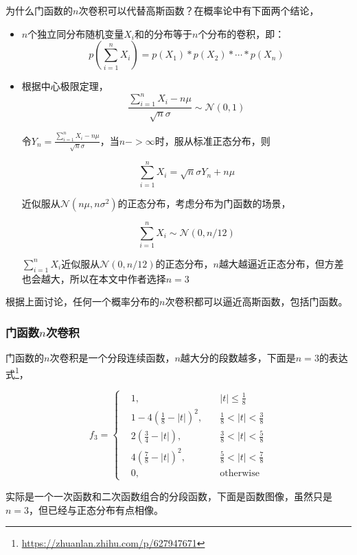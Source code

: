 			为什么门函数的$n$次卷积可以代替高斯函数？在概率论中有下面两个结论，
			\begin{itemize}
				\item $n$个独立同分布随机变量$X_i$和的分布等于$n$个分布的卷积，即：
				$$
					p\left(\sum_{i=1}^nX_i\right) = p(X_1) * p(X_2) * \cdots * p(X_n)
				$$
				\item 根据中心极限定理，
				$$
					\frac{\sum_{i=1}^nX_i - n\mu}{\sqrt{n}\sigma} \sim \mathcal{N}(0, 1)
				$$

				令$Y_n = \frac{\sum_{i=1}^nX_i - n\mu}{\sqrt{n}\sigma}$，当$n->\infty$时，服从标准正态分布，则

				$$
					\sum_{i=1}^nX_i  = \sqrt{n}\sigma Y_n + n\mu
				$$

				近似服从$\mathcal{N}(n\mu, n\sigma^2)$的正态分布，考虑分布为门函数的场景，

				$$
					\sum_{i=1}^nX_i \sim \mathcal{N}(0, n/12)
				$$

				$\sum_{i=1}^nX_i$近似服从$\mathcal{N}(0, n/12)$的正态分布，$n$越大越逼近正态分布，但方差也会越大，所以在本文中作者选择$n=3$
			\end{itemize}

			根据上面讨论，任何一个概率分布的$n$次卷积都可以逼近高斯函数，包括门函数。

		\subsubsection*{门函数$n$次卷积}
			门函数的$n$次卷积是一个分段连续函数，$n$越大分的段数越多，下面是$n=3$的表达式\footnote{\url{https://zhuanlan.zhihu.com/p/627947671}}，

			$$
				f_3 = \left\lbrace 
					\begin{aligned}
						&1,  &\quad |t| \leq \frac{1}{8}\\
						&1 - 4\left(\frac{1}{8} - |t|\right)^2, & \quad\frac{1}{8} < |t| < \frac{3}{8}\\
						&2\left(\frac{3}{4} - |t|\right), & \quad \frac{3}{8} < |t| < \frac{5}{8}\\
						&4\left(\frac{7}{8} - |t|\right)^2, & \quad \frac{5}{8} < |t| < \frac{7}{8}\\
						&0, & \quad \text{otherwise}
					\end{aligned}
					\right .
			$$

			实际是一个一次函数和二次函数组合的分段函数，下面是函数图像，虽然只是$n=3$，但已经与正态分布有点相像。

